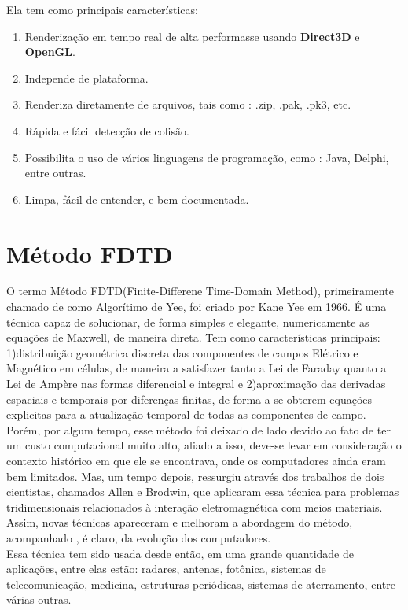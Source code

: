 Ela tem como principais características:
\begin{enumerate}
\item Renderização em tempo real de alta performasse usando \textbf{Direct3D} e \textbf{OpenGL}.
\item Independe de plataforma.
\item Renderiza diretamente de arquivos, tais como : .zip, .pak, .pk3, etc.
\item Rápida e fácil detecção de colisão.
\item Possibilita o uso de vários linguagens de programação, como : Java, Delphi, entre outras.
\item Limpa, fácil de entender, e bem documentada.
\end{enumerate}

\section{Método FDTD}
O termo Método FDTD(Finite-Differene Time-Domain Method), primeiramente chamado de como Algorítimo de Yee, foi criado por Kane Yee em 1966\cite{yeebook}. É uma técnica capaz de solucionar, de forma simples e elegante, numericamente as equações de Maxwell, de maneira direta. Tem como características principais: 1)distribuição geométrica discreta das componentes de campos Elétrico e Magnético em células, de maneira a satisfazer tanto a Lei de Faraday quanto a Lei de Ampère nas formas diferencial e integral e 2)aproximação das derivadas espaciais e temporais por diferenças finitas, de forma a se obterem equações explicitas para a atualização temporal de todas as componentes de campo\cite{rodrigo}.\\

Porém, por algum tempo, esse método foi deixado de lado devido ao fato de ter um custo computacional muito alto, aliado a isso, deve-se levar em consideração o contexto histórico em que ele se encontrava, onde os computadores ainda eram bem limitados. Mas, um tempo depois, ressurgiu através dos trabalhos de dois cientistas, chamados Allen e Brodwin, que aplicaram essa técnica para problemas tridimensionais relacionados à interação eletromagnética com meios materiais\cite{allen}. Assim, novas técnicas apareceram e melhoram a abordagem do método, acompanhado , é claro, da evolução dos computadores.\\

Essa técnica tem sido usada desde então, em uma grande quantidade de aplicações, entre elas estão: radares, antenas, fotônica, sistemas de telecomunicação, medicina, estruturas periódicas, sistemas de aterramento, entre várias outras.\\

